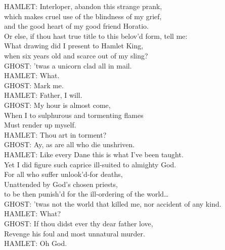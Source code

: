\begin{playdialog}%
HAMLET: Interloper, abandon this strange prank,\\
which makes cruel use of the blindness of my grief,\\
and the good heart of my good friend Horatio.\\
Or else, if thou hast true title to this belov'd form, tell me:\\
What drawing did I present to Hamlet King,\\
when six years old and scarce out of my sling?\\

GHOST: 'twas a unicorn clad all in mail.\\

HAMLET: What.\\

GHOST: Mark me.\\

HAMLET: Father, I will.\\

GHOST: My hour is almost come,\\
When I to sulphurous and tormenting flames\\
Must render up myself.\\

HAMLET: Thou art in torment?\\

GHOST: Ay, as are all who die unshriven.\\

HAMLET: Like every Dane this is what I've been taught.\\
Yet I did figure such caprice ill-suited to almighty God.\\
For all who suffer unlook'd-for deaths,\\
Unattended by God's chosen priests,\\
to be then punish'd for the ill-ordering of the world{\ldots}\\

GHOST: 'twas not the world that killed me, nor accident of any kind.\\

HAMLET: What?\\

GHOST: If thou didst ever thy dear father love,\\
Revenge his foul and most unnatural murder.\\

HAMLET: Oh God.\\


\end{playdialog}
